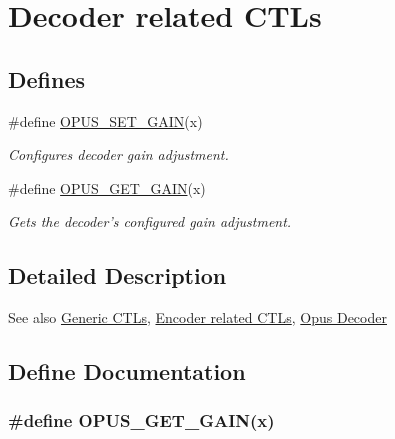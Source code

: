 \hypertarget{group__opus__decoderctls}{
\section{Decoder related CTLs}
\label{group__opus__decoderctls}
}
\subsection*{Defines}
\begin{DoxyCompactItemize}
\item 
\#define \hyperlink{group__opus__decoderctls_ga8ddb6fa694efa2c7e95ef51addc70dac}{OPUS\_\-SET\_\-GAIN}(x)
\begin{DoxyCompactList}\small\item\em Configures decoder gain adjustment. \item\end{DoxyCompactList}\item 
\#define \hyperlink{group__opus__decoderctls_ga00ca8b4bd753a837f143ebd8ed63d247}{OPUS\_\-GET\_\-GAIN}(x)
\begin{DoxyCompactList}\small\item\em Gets the decoder's configured gain adjustment. \item\end{DoxyCompactList}\end{DoxyCompactItemize}


\subsection{Detailed Description}
\begin{DoxySeeAlso}{See also}
\hyperlink{group__opus__genericctls}{Generic CTLs}, \hyperlink{group__opus__encoderctls}{Encoder related CTLs}, \hyperlink{group__opus__decoder}{Opus Decoder} 
\end{DoxySeeAlso}


\subsection{Define Documentation}
\hypertarget{group__opus__decoderctls_ga00ca8b4bd753a837f143ebd8ed63d247}{
\subsubsection[{OPUS\_\-GET\_\-GAIN}]{\setlength{\rightskip}{0pt plus 5cm}\#define OPUS\_\-GET\_\-GAIN(x)}}
\label{group__opus__decoderctls_ga00ca8b4bd753a837f143ebd8ed63d247}


